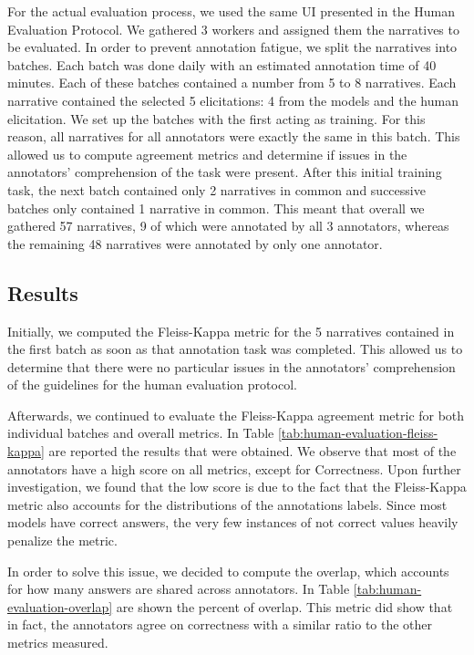 For the actual evaluation process, we used the same UI presented in the Human Evaluation Protocol. %
We gathered 3 workers and assigned them the narratives to be evaluated.  
In order to prevent annotation fatigue, we split the narratives into batches. Each batch was done daily with an estimated annotation time of 40 minutes. Each of these batches contained a number from 5 to 8 narratives. Each narrative contained the selected 5 elicitations: 4 from the models and the human elicitation. We set up the batches with the first acting as training. For this reason, all narratives for all annotators were exactly the same in this batch. This allowed us to compute agreement metrics and determine if issues in the annotators' comprehension of the task were present. After this initial training task, the next batch contained only 2 narratives in common and successive batches only contained 1 narrative in common. This meant that overall we gathered 57 narratives, 9 of which were annotated by all 3 annotators, whereas the remaining 48 narratives were annotated by only one annotator. 


\subsection{Results}
Initially, we computed the Fleiss-Kappa \cite{fleiss} metric for the 5 narratives contained in the first batch as soon as that annotation task was completed. This allowed us to determine that there were no particular issues in the annotators' comprehension of the guidelines for the human evaluation protocol.

Afterwards, we continued to evaluate the Fleiss-Kappa \cite{fleiss} agreement metric for both individual batches and overall metrics. In Table \ref{tab:human-evaluation-fleiss-kappa} are reported the results that were obtained. We observe that most of the annotators have a high score on all metrics, except for Correctness. Upon further investigation, we found that the low score is due to the fact that the Fleiss-Kappa metric also accounts for the distributions of the annotations labels. Since most models have correct answers, the very few instances of not correct values heavily penalize the metric.

In order to solve this issue, we decided to compute the overlap, which accounts for how many answers are shared across annotators. In Table \ref{tab:human-evaluation-overlap} are shown the percent of overlap. This metric did show that in fact, the annotators agree on correctness with a similar ratio to the other metrics measured. 



